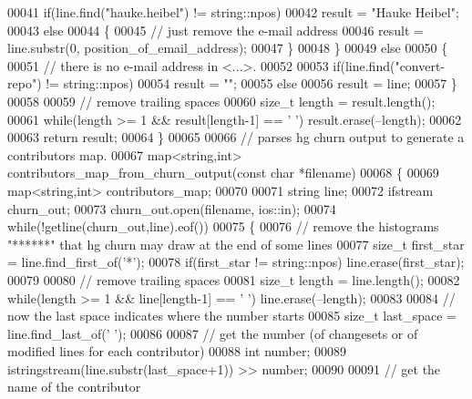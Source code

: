\begin{DoxyCode}
00041     \textcolor{keywordflow}{if}(line.find(\textcolor{stringliteral}{"hauke.heibel"}) != string::npos)
00042       result = \textcolor{stringliteral}{"Hauke Heibel"};
00043     \textcolor{keywordflow}{else}
00044     \{
00045       \textcolor{comment}{// just remove the e-mail address}
00046       result = line.substr(0, position\_of\_email\_address);
00047     \}
00048   \}
00049   \textcolor{keywordflow}{else}
00050   \{
00051     \textcolor{comment}{// there is no e-mail address in <...>.}
00052     
00053     \textcolor{keywordflow}{if}(line.find(\textcolor{stringliteral}{"convert-repo"}) != string::npos)
00054       result = \textcolor{stringliteral}{""};
00055     \textcolor{keywordflow}{else}
00056       result = line;
00057   \}
00058 
00059   \textcolor{comment}{// remove trailing spaces}
00060   \textcolor{keywordtype}{size\_t} length = result.length();
00061   \textcolor{keywordflow}{while}(length >= 1 && result[length-1] == \textcolor{charliteral}{' '}) result.erase(--length);
00062 
00063   \textcolor{keywordflow}{return} result;
00064 \}
00065 
00066 \textcolor{comment}{// parses hg churn output to generate a contributors map.}
00067 map<string,int> contributors\_map\_from\_churn\_output(\textcolor{keyword}{const} \textcolor{keywordtype}{char} *filename)
00068 \{
00069   map<string,int> contributors\_map;
00070 
00071   \textcolor{keywordtype}{string} line;
00072   ifstream churn\_out;
00073   churn\_out.open(filename, ios::in);
00074   \textcolor{keywordflow}{while}(!getline(churn\_out,line).eof())
00075   \{
00076     \textcolor{comment}{// remove the histograms "******" that hg churn may draw at the end of some lines}
00077     \textcolor{keywordtype}{size\_t} first\_star = line.find\_first\_of(\textcolor{charliteral}{'*'});
00078     \textcolor{keywordflow}{if}(first\_star != string::npos) line.erase(first\_star);
00079     
00080     \textcolor{comment}{// remove trailing spaces}
00081     \textcolor{keywordtype}{size\_t} length = line.length();
00082     \textcolor{keywordflow}{while}(length >= 1 && line[length-1] == \textcolor{charliteral}{' '}) line.erase(--length);
00083 
00084     \textcolor{comment}{// now the last space indicates where the number starts}
00085     \textcolor{keywordtype}{size\_t} last\_space = line.find\_last\_of(\textcolor{charliteral}{' '});
00086     
00087     \textcolor{comment}{// get the number (of changesets or of modified lines for each contributor)}
00088     \textcolor{keywordtype}{int} number;
00089     istringstream(line.substr(last\_space+1)) >> number;
00090 
00091     \textcolor{comment}{// get the name of the contributor}

\end{DoxyCode}

